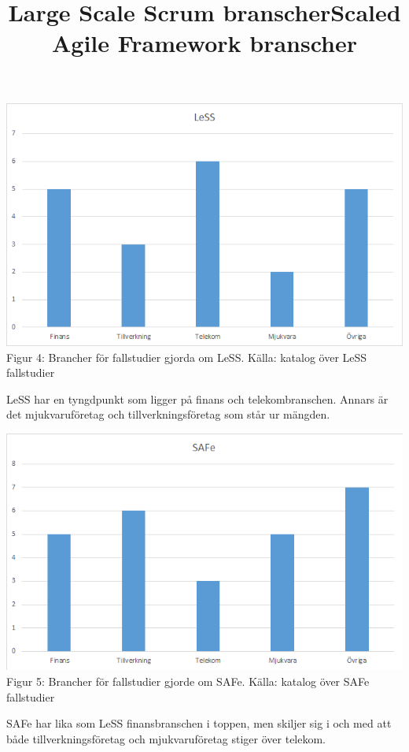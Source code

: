 			\title{Large Scale Scrum branscher}
			\begin{center}
				\includegraphics{Grafer/LeSS_brancher.png}
				\\ Figur 4: Brancher för fallstudier gjorda om LeSS. Källa: katalog över LeSS fallstudier \cite{less_casestudies} 
			\end{center}
		
			LeSS har en tyngdpunkt som ligger på finans och telekombranschen. Annars är det mjukvaruföretag och tillverkningsföretag som står ur mängden.\\		
				
				
			\title{Scaled Agile Framework branscher}
			\begin{center}
				\includegraphics{Grafer/SAFe_brancher.png}
				\\ Figur 5: Brancher för fallstudier gjorde om SAFe. Källa: katalog över SAFe fallstudier \cite{safe_casestudies}
			\end{center}
					
			SAFe har lika som LeSS finansbranschen i toppen, men skiljer sig i och med att både tillverkningsföretag och mjukvaruföretag stiger över telekom.
			
